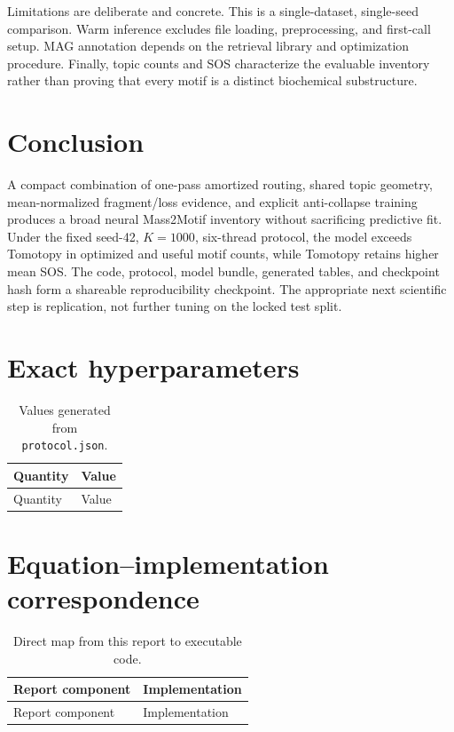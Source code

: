 \documentclass[10pt,a4paper]{article}
\begin{document}
Limitations are deliberate and concrete. This is a single-dataset,
single-seed comparison. Warm inference excludes file loading, preprocessing,
and first-call setup. MAG annotation depends on the retrieval library and
optimization procedure. Finally, topic counts and SOS characterize the
evaluable inventory rather than proving that every motif is a distinct
biochemical substructure.

\section{Conclusion}

A compact combination of one-pass amortized routing, shared topic geometry,
mean-normalized fragment/loss evidence, and explicit anti-collapse training
produces a broad neural Mass2Motif inventory without sacrificing predictive
fit. Under the fixed seed-42, $K=1000$, six-thread protocol, the model exceeds
Tomotopy in optimized and useful motif counts, while
Tomotopy retains higher mean SOS. The code, protocol, model bundle, generated
tables, and checkpoint hash form a shareable reproducibility checkpoint. The
appropriate next scientific step is replication, not further tuning on the
locked test split.

\appendix
\section{Exact hyperparameters}

\begingroup
\small
\begin{longtable}{@{}>{\raggedright\arraybackslash}p{}>{\raggedright\arraybackslash}p{}@{}}
\caption{Values generated from \texttt{protocol.json}.}\label{tab:hyperparameters}\\
\toprule
Quantity & Value \\
\midrule
\endfirsthead
\toprule
Quantity & Value \\
\midrule
\endhead

\end{longtable}
\endgroup

\section{Equation--implementation correspondence}

\begingroup
\small
\begin{longtable}{@{}>{\raggedright\arraybackslash}p{}>{\raggedright\arraybackslash}p{}@{}}
\caption{Direct map from this report to executable code.}\label{tab:code-map}\\
\toprule
Report component & Implementation \\
\midrule
\endfirsthead
\toprule
Report component & Implementation \\
\midrule
\endhead

\end{longtable}
\endgroup
\end{document}
